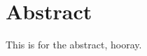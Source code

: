 
\cleardoublepage
{}
\abstand
\section{Abstract}

\vspace{1.2em}
\noindent This is for the abstract, hooray.